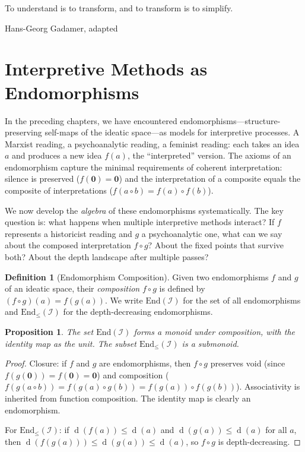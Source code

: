 \documentclass[11pt,openany]{book}
\theoremstyle{definition}
\newtheorem{definition}[axiom]{Definition}
\theoremstyle{plain}
\newtheorem{proposition}[axiom]{Proposition}
\theoremstyle{remark}
\newcommand{\IS}{\mathcal{I}}               %
\newcommand{\compose}{\circ}                 %
\newcommand{\void}{\mathbf{0}}              %
\newcommand{\depth}{\operatorname{d}}       %
\begin{document}
\epigraph{To understand is to transform, and to transform is to simplify.}{Hans-Georg Gadamer, adapted}

\section{Interpretive Methods as Endomorphisms}

In the preceding chapters, we have encountered endomorphisms---structure-preserving self-maps of the ideatic space---as models for interpretive processes. A Marxist reading, a psychoanalytic reading, a feminist reading: each takes an idea $a$ and produces a new idea $f(a)$, the ``interpreted'' version. The axioms of an endomorphism capture the minimal requirements of coherent interpretation: silence is preserved ($f(\void) = \void$) and the interpretation of a composite equals the composite of interpretations ($f(a \compose b) = f(a) \compose f(b)$).

We now develop the \emph{algebra} of these endomorphisms systematically. The key question is: what happens when multiple interpretive methods interact? If $f$ represents a historicist reading and $g$ a psychoanalytic one, what can we say about the composed interpretation $f \circ g$? About the fixed points that survive both? About the depth landscape after multiple passes?

\begin{definition}[Endomorphism Composition]
Given two endomorphisms $f$ and $g$ of an ideatic space, their \emph{composition} $f \circ g$ is defined by $(f \circ g)(a) = f(g(a))$. We write $\mathrm{End}(\IS)$ for the set of all endomorphisms and $\mathrm{End}_{\leq}(\IS)$ for the depth-decreasing endomorphisms.
\end{definition}

\begin{proposition}
The set $\mathrm{End}(\IS)$ forms a monoid under composition, with the identity map as the unit. The subset $\mathrm{End}_{\leq}(\IS)$ is a submonoid.
\end{proposition}

\begin{proof}
Closure: if $f$ and $g$ are endomorphisms, then $f \circ g$ preserves void (since $f(g(\void)) = f(\void) = \void$) and composition ($f(g(a \compose b)) = f(g(a) \compose g(b)) = f(g(a)) \compose f(g(b))$). Associativity is inherited from function composition. The identity map is clearly an endomorphism.

For $\mathrm{End}_{\leq}(\IS)$: if $\depth(f(a)) \leq \depth(a)$ and $\depth(g(a)) \leq \depth(a)$ for all $a$, then $\depth(f(g(a))) \leq \depth(g(a)) \leq \depth(a)$, so $f \circ g$ is depth-decreasing.
\end{proof}
\end{document}

